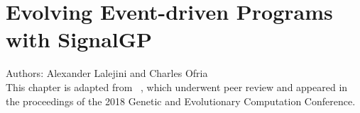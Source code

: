 \chapter{Evolving Event-driven Programs with SignalGP}
\label{chapter:signalgp}



\noindent
Authors: Alexander Lalejini and Charles Ofria \\
This chapter is adapted from ~\citep{lalejini_evolving_2018}, which underwent peer review and appeared in the proceedings of the 2018 Genetic and Evolutionary Computation Conference.









